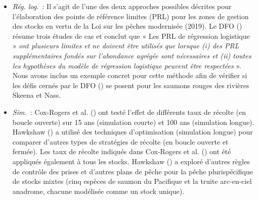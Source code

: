 \documentclass[french,11pt]{book}
\begin{document}
\begin{itemize}
\item
  \emph{Rég. log.}~: Il s'agit de l'une des deux approches possibles décrites pour l'élaboration des points de référence limites (PRL) pour les zones de gestion des stocks en vertu de la Loi sur les pêches modernisée (2019). Le DFO () résume trois études de cas et conclut que « Les PRL de régression logistique » \emph{ont plusieurs limites et ne doivent être utilisés que lorsque (i) des PRL supplémentaires fondés sur l'abondance agrégée sont nécessaires et (ii) toutes les hypothèses du modèle de régression logistique peuvent être respectées} ». Nous avons inclus un exemple concret pour cette méthode afin de vérifier si les défis cernés par le DFO () se posent pour les saumons rouges des rivières Skeena et Nass.
\item
  \emph{Sim.}~: Cox-Rogers et al. () ont testé l'effet de différents taux de récolte (en boucle ouverte) sur 15 ans (simulation courte) et 100 ans (simulation longue). Hawkshaw () a utilisé des techniques d'optimisation (simulation longue) pour comparer d'autres types de stratégies de récolte (en boucle ouverte et fermée). Les taux de récolte indiqués dans Cox-Rogers et al. () ont été appliqués également à tous les stocks. Hawkshaw () a exploré d'autres règles de contrôle des prises et d'autres plans de pêche pour la pêche plurispécifique de stocks mixtes (cinq espèces de saumon du Pacifique et la truite arc-en-ciel anadrome, chacune modélisée comme un stock unique).
\end{itemize}
\clearpage
\end{document}
